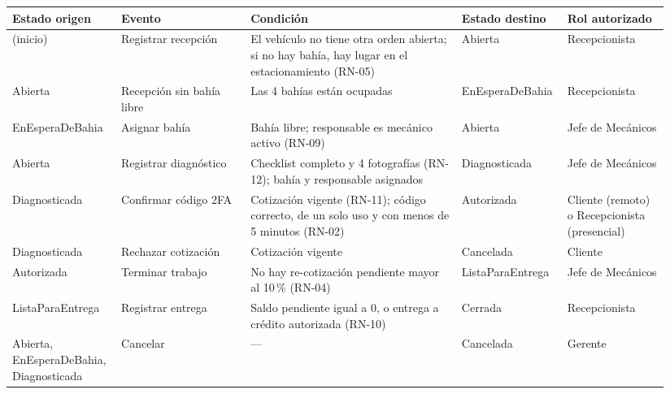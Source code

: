 {\footnotesize
\begin{longtable}{@{}L{0.15\linewidth}L{0.19\linewidth}L{0.31\linewidth}L{0.14\linewidth}L{0.15\linewidth}@{}}
\toprule
\textbf{Estado origen} & \textbf{Evento} & \textbf{Condición} & \textbf{Estado destino} & \textbf{Rol autorizado} \\
\midrule
\endhead
\bottomrule
\endlastfoot
(inicio) & Registrar recepción & El vehículo no tiene otra orden abierta; si no hay bahía, hay lugar en el estacionamiento (RN-05) & Abierta & Recepcionista \\
Abierta & Recepción sin bahía libre & Las 4 bahías están ocupadas & EnEsperaDeBahia & Recepcionista \\
EnEsperaDeBahia & Asignar bahía & Bahía libre; responsable es mecánico activo (RN-09) & Abierta & Jefe de Mecánicos \\
Abierta & Registrar diagnóstico & Checklist completo y 4 fotografías (RN-12); bahía y responsable asignados & Diagnosticada & Jefe de Mecánicos \\
Diagnosticada & Confirmar código 2FA & Cotización vigente (RN-11); código correcto, de un solo uso y con menos de 5 minutos (RN-02) & Autorizada & Cliente (remoto) o Recepcionista (presencial) \\
Diagnosticada & Rechazar cotización & Cotización vigente & Cancelada & Cliente \\
Autorizada & Terminar trabajo & No hay re-cotización pendiente mayor al 10\,\% (RN-04) & ListaParaEntrega & Jefe de Mecánicos \\
ListaParaEntrega & Registrar entrega & Saldo pendiente igual a 0, o entrega a crédito autorizada (RN-10) & Cerrada & Recepcionista \\
Abierta, EnEsperaDeBahia, Diagnosticada & Cancelar & --- & Cancelada & Gerente \\
\end{longtable}
}


